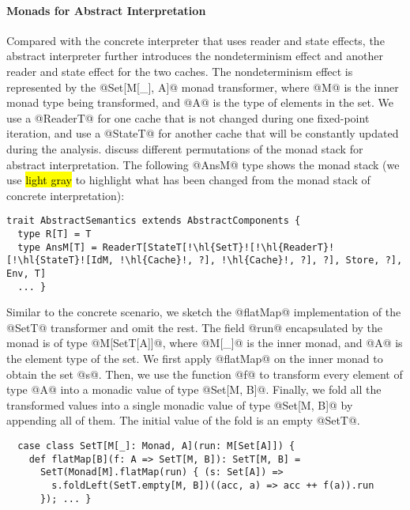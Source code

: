 \paragraph{Monads for Abstract Interpretation}
Compared with the concrete interpreter that uses reader and state effects, the
abstract interpreter further introduces the nondeterminism effect and another
reader and state effect for the two caches. The nondeterminism effect is
represented by the @Set[M[_], A]@ monad transformer, where @M@ is the inner
monad type being transformed, and @A@ is the type of elements in the set. 
We use a @ReaderT@ for one cache that is not changed during one fixed-point
iteration, and use a @StateT@ for another cache that will be constantly updated
during the analysis.
\citet{DBLP:journals/pacmpl/DaraisLNH17} discuss different permutations of the
monad stack for abstract interpretation. The following @AnsM@ type shows the
monad stack (we use \hl{light gray} to highlight what has been changed from
the monad stack of concrete interpretation):
\begin{lstlisting}[escapechar=!]
trait AbstractSemantics extends AbstractComponents {
  type R[T] = T
  type AnsM[T] = ReaderT[StateT[!\hl{SetT}![!\hl{ReaderT}![!\hl{StateT}![IdM, !\hl{Cache}!, ?], !\hl{Cache}!, ?], ?], Store, ?], Env, T]
  ... }
\end{lstlisting}

Similar to the concrete scenario, we sketch the @flatMap@ implementation of the
@SetT@ transformer and omit the rest. The field @run@ encapsulated by the monad
is of type @M[SetT[A]]@, where @M[_]@ is the inner monad, and @A@ is the element
type of the set. We first apply @flatMap@ on the inner monad to obtain the
set @s@. Then, we use the function @f@ to transform every element of type @A@
into a monadic value of type @Set[M, B]@. Finally, we fold all the transformed
values into a single monadic value of type @Set[M, B]@ by appending all of them.
The initial value of the fold is an empty @SetT@.
\begin{lstlisting}
  case class SetT[M[_]: Monad, A](run: M[Set[A]]) {
    def flatMap[B](f: A => SetT[M, B]): SetT[M, B] =
      SetT(Monad[M].flatMap(run) { (s: Set[A]) =>
        s.foldLeft(SetT.empty[M, B])((acc, a) => acc ++ f(a)).run
      }); ... }
\end{lstlisting}

